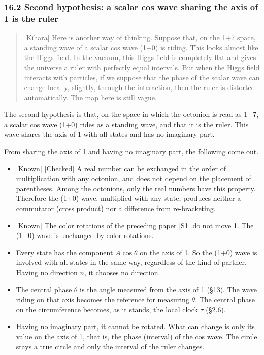 \documentclass[
  a4paper,
]{article}
\providecommand{\tightlist}{%
  \setlength{\itemsep}{0pt}\setlength{\parskip}{0pt}}
\begin{document}
\subsubsection{16.2 Second hypothesis: a scalar cos wave sharing the
axis of 1 is the
ruler}\label{second-hypothesis-a-scalar-cos-wave-sharing-the-axis-of-1-is-the-ruler}

\begin{quote}
{[}Kihara{]} Here is another way of thinking. Suppose that, on the 1+7
space, a standing wave of a scalar cos wave (1+0) is riding. This looks
almost like the Higgs field. In the vacuum, this Higgs field is
completely flat and gives the universe a ruler with perfectly equal
intervals. But when the Higgs field interacts with particles, if we
suppose that the phase of the scalar wave can change locally, slightly,
through the interaction, then the ruler is distorted automatically. The
map here is still vague.
\end{quote}

The second hypothesis is that, on the space in which the octonion is
read as 1+7, a scalar cos wave (1+0) rides as a standing wave, and that
it is the ruler. This wave shares the axis of 1 with all states and has
no imaginary part.

From sharing the axis of 1 and having no imaginary part, the following
come out.

\begin{itemize}
\tightlist
\item
  {[}Known{]} {[}Checked{]} A real number can be exchanged in the order
  of multiplication with any octonion, and does not depend on the
  placement of parentheses. Among the octonions, only the real numbers
  have this property. Therefore the (1+0) wave, multiplied with any
  state, produces neither a commutator (cross product) nor a difference
  from re-bracketing.
\item
  {[}Known{]} The color rotations of the preceding paper {[}S1{]} do not
  move 1. The (1+0) wave is unchanged by color rotations.
\item
  Every state has the component \(A\cos\theta\) on the axis of 1. So the
  (1+0) wave is involved with all states in the same way, regardless of
  the kind of partner. Having no direction \(n\), it chooses no
  direction.
\item
  The central phase \(\theta\) is the angle measured from the axis of 1
  (§13). The wave riding on that axis becomes the reference for
  measuring \(\theta\). The central phase on the circumference becomes,
  as it stands, the local clock \(\tau\) (§2.6).
\item
  Having no imaginary part, it cannot be rotated. What can change is
  only its value on the axis of 1, that is, the phase (interval) of the
  cos wave. The circle stays a true circle and only the interval of the
  ruler changes.
\end{itemize}
\end{document}
